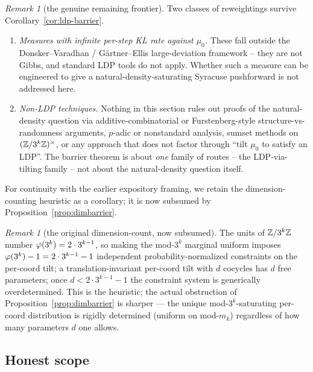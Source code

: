 \documentclass[11pt]{amsart}
\theoremstyle{definition}
\theoremstyle{remark}
\newtheorem{remark}[theorem]{Remark}
\begin{document}
\begin{remark}[the genuine remaining frontier]\label{rem:dimbarrier-frontier}
Two classes of reweightings survive Corollary~\ref{cor:ldp-barrier}.
\begin{enumerate}[label=\textup{(F\arabic*)},leftmargin=*]
\item \emph{Measures with infinite per-step KL rate against $\mu_0$.} These fall outside the
Donsker--Varadhan / G\"artner--Ellis large-deviation framework -- they are not Gibbs, and
standard LDP tools do not apply. Whether such a measure can be engineered to give a
natural-density-saturating Syracuse pushforward is not addressed here.
\item \emph{Non-LDP techniques.} Nothing in this section rules out proofs of the natural-density
question via additive-combinatorial or Furstenberg-style structure-vs-randomness arguments,
$p$-adic or nonstandard analysis, sumset methods on $(\mathbb{Z}/3^{k}\mathbb{Z})^{\times}$, or any approach that does
not factor through ``tilt $\mu_0$ to satisfy an LDP''. The barrier theorem is about \emph{one}
family of routes -- the LDP-via-tilting family -- not about the natural-density question itself.
\end{enumerate}
\end{remark}

For continuity with the earlier expository framing, we retain the dimension-counting heuristic as a
corollary; it is now subsumed by Proposition~\ref{prop:dimbarrier}.

\begin{remark}[the original dimension-count, now subsumed]\label{rem:dimbarrier}
The units of $\mathbb{Z}/3^k\mathbb{Z}$ number $\varphi(3^k)=2\cdot 3^{k-1}$, so making the mod-$3^k$ marginal uniform
imposes $\varphi(3^k)-1=2\cdot 3^{k-1}-1$ independent probability-normalized constraints on the per-coord
tilt; a translation-invariant per-coord tilt with $d$ cocycles has $d$ free parameters; once
$d<2\cdot 3^{k-1}-1$ the constraint system is generically overdetermined. This is the heuristic; the
actual obstruction of Proposition~\ref{prop:dimbarrier} is sharper --- the unique
mod-$3^k$-saturating per-coord distribution is rigidly determined (uniform on mod-$m_k$) regardless of
how many parameters $d$ one allows.
\end{remark}

\subsection{Honest scope}
\end{document}
